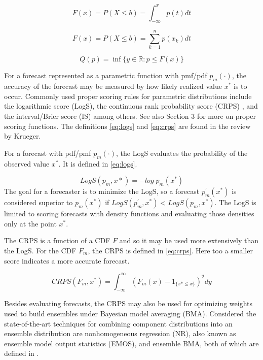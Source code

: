 \documentclass[11pt,notitlepage]{isuthesis}
\begin{document}
\begin{equation}
\label{eq:ccdf}
  F(x) = P(X \leq b) = \int_{-\infty}^x p(t) dt
\end{equation}

\begin{equation}
\label{eq:dcdf}
  F(x) = P(X \leq b) = \sum_{k=1}^n p(x_k) dt
\end{equation}

\begin{equation}
\label{eq:quant}
  Q(p) = \inf \{ y \in \mathbb{R} : p \leq F(x) \}
\end{equation}



For a forecast represented as a parametric function with pmf/pdf $p_m(\cdot)$, 
the accuracy of the forecast may be measured by how likely realized value $x^*$
is to occur. Commonly used proper scoring rules for parametric distributions
include the logarithmic score (LogS), the
continuous rank probability score (CRPS) \cite{hersbach2000decomposition}
\cite{alves2013ncep}, and the interval/Brier 
score (IS) \cite{gneiting2007strictly} among 
others. See also \cite{gneiting2014probabilistic}
Section 3 for more on proper scoring functions. The definitions 
\eqref{eq:logs} and \eqref{eq:crps} are found in the review by Krueger.

For a forecast with pdf/pmf $p_m(\cdot)$, the LogS evaluates the 
probability of the observed value $x^*$. It is defined in \eqref{eq:logs}.

\begin{equation}
\label{eq:logs}
  LogS(p_m,x*) = -log\;p_m(x^*)
\end{equation}
The goal for a forecaster is to minimize the LogS, so a forecast $p^{'}_m(x^*)$ 
is considered 
superior to $p_m(x^*)$ if
$LogS(p^{'}_m, x^*) < LogS(p_m, x^*)$.
The LogS is limited to scoring forecasts with density functions and
evaluating those densities only at the point $x^*$.

The CRPS is a function of a CDF $F$
and so it may
be used more extensively than the LogS. 
For the CDF $F_m$, the CRPS is defined in \eqref{eq:crps}.
Here too a smaller score indicates a more accurate forecast.

\begin{equation}
\label{eq:crps}
  CRPS(F_m, x^*) = \int_{-\infty}^{\infty} (F_m(x)- 1_{\{x*\leq x\}})^2 dy
\end{equation}


Besides evaluating forecasts, the CRPS may also be used for optimizing weights 
used
to build ensembles under Bayesian model averaging (BMA). Considered the 
state-of-the-art techniques for combining 
component distributions
into an ensemble distribution are nonhomogeneous regression (NR), also known as
ensemble model output statistics (EMOS), and ensemble
BMA, both of which are defined in \cite{gneiting2014probabilistic}.
\end{document}

